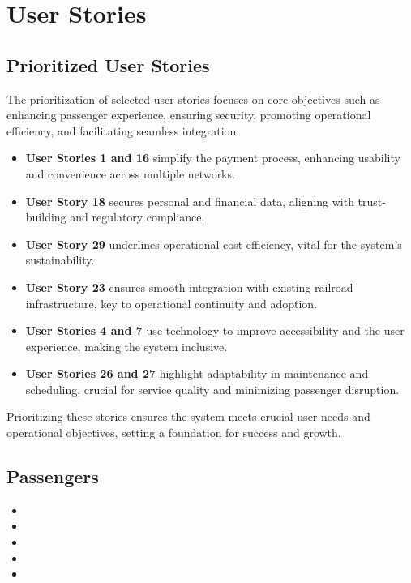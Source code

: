 \section{User Stories}

\subsection{Prioritized User Stories}
The prioritization of selected user stories focuses on core objectives such as enhancing passenger experience, ensuring security, promoting operational efficiency, and facilitating seamless integration:

\begin{itemize}
    \item \textbf{User Stories 1 and 16} simplify the payment process, enhancing usability and convenience across multiple networks.
    \item \textbf{User Story 18} secures personal and financial data, aligning with trust-building and regulatory compliance.
    \item \textbf{User Story 29} underlines operational cost-efficiency, vital for the system's sustainability.
    \item \textbf{User Story 23} ensures smooth integration with existing railroad infrastructure, key to operational continuity and adoption.
    \item \textbf{User Stories 4 and 7} use technology to improve accessibility and the user experience, making the system inclusive.
    \item \textbf{User Stories 26 and 27} highlight adaptability in maintenance and scheduling, crucial for service quality and minimizing passenger disruption.
\end{itemize}

Prioritizing these stories ensures the system meets crucial user needs and operational objectives, setting a foundation for success and growth.

\subsection{Passengers}
\begin{itemize}
    \item \userStoryOne
    \item \userStoryTwo
    \item \userStoryThree
    \item \userStoryThirtySeven
    \item \userStoryThirtyNine
\end{itemize}

